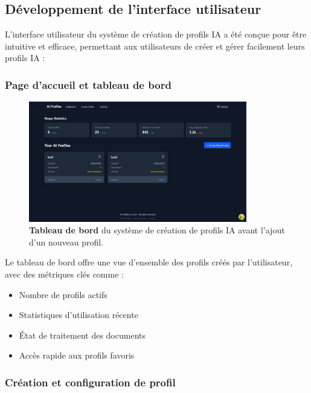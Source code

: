 \subsection{Développement de l'interface utilisateur}

L'interface utilisateur du système de création de profils IA a été conçue pour être intuitive et efficace, permettant aux utilisateurs de créer et gérer facilement leurs profils IA :

\subsubsection{Page d'accueil et tableau de bord}

\begin{figure}[H]
  \centering
  \includegraphics[width=0.85\textwidth,keepaspectratio]{pfe-pics/ai-profile-creation/dashboared_befor_adding_a_new_ai_profile.png}
  \caption{\textbf{Tableau de bord} du système de création de profils IA avant l'ajout d'un nouveau profil.}
  \label{fig:ai_dashboard}
\end{figure}

Le tableau de bord offre une vue d'ensemble des profils créés par l'utilisateur, avec des métriques clés comme :

\begin{itemize}
  \item Nombre de profils actifs
  \item Statistiques d'utilisation récente
  \item État de traitement des documents
  \item Accès rapide aux profils favoris
\end{itemize}

\subsubsection{Création et configuration de profil}

